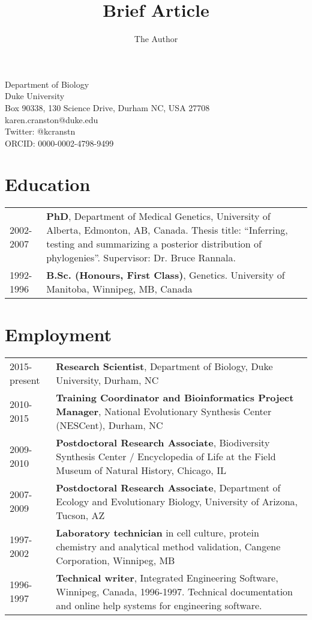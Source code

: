 \documentclass[10pt]{article}
\title{Brief Article}
\author{The Author}
\begin{document}
Department of Biology  \\
Duke University \\
Box 90338, 130 Science Drive, Durham NC, USA 27708 \\
karen.cranston@duke.edu \\
Twitter: @kcranstn \\
ORCID: 0000-0002-4798-9499

\section*{Education}
\begin{table}[h]
	\begin{tabular}{ p{2.0cm} p{12.4cm} }
		2002-2007 & {\bf PhD}, Department of Medical Genetics, University of Alberta, Edmonton, AB, Canada. Thesis title: ``Inferring, testing and summarizing a posterior distribution of phylogenies''. Supervisor: Dr. Bruce Rannala. \\
		1992-1996 & {\bf B.Sc. (Honours, First Class)}, Genetics. University of Manitoba, Winnipeg, MB, Canada \\
	\end{tabular}
\end{table}

\section*{Employment}
\begin{table}[h]
	\begin{tabular}{ p{2.0cm} p{12.4cm} }
		2015-present & \textbf{Research Scientist}, Department of Biology, Duke University, Durham, NC \\
		2010-2015 & \textbf{Training Coordinator and Bioinformatics Project Manager}, National Evolutionary Synthesis Center (NESCent), Durham, NC \\
		2009-2010 & \textbf{Postdoctoral Research Associate}, Biodiversity Synthesis Center / Encyclopedia of Life at the Field Museum of Natural History, Chicago, IL  \\
		2007-2009 & \textbf{Postdoctoral Research Associate}, Department of Ecology and Evolutionary Biology, University of Arizona, Tucson, AZ \\
		1997-2002 & \textbf{Laboratory technician} in cell culture, protein chemistry and analytical method validation, Cangene Corporation, Winnipeg, MB \\
		1996-1997 & \textbf{Technical writer}, Integrated Engineering Software, Winnipeg, Canada, 1996-1997. Technical documentation and online help systems for engineering software. \\
	\end{tabular}
\end{table}
\end{document}
